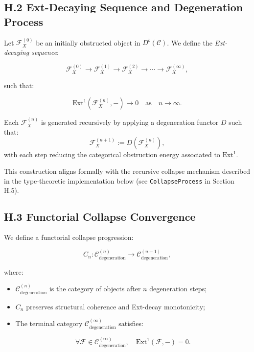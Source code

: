 \documentclass[11pt]{article}
\begin{document}
\subsection*{H.2 Ext-Decaying Sequence and Degeneration Process}

Let \( \mathcal{F}_X^{(0)} \) be an initially obstructed object in \( D^b(\mathcal{C}) \). We define the \emph{Ext-decaying sequence}:

\[
\mathcal{F}_X^{(0)} \longrightarrow \mathcal{F}_X^{(1)} \longrightarrow \mathcal{F}_X^{(2)} \longrightarrow \cdots \longrightarrow \mathcal{F}_X^{(\infty)},
\]

such that:

\[
\mathrm{Ext}^1\left( \mathcal{F}_X^{(n)}, - \right) \to 0 \quad \text{as} \quad n \to \infty.
\]

Each \( \mathcal{F}_X^{(n)} \) is generated recursively by applying a degeneration functor \( D \) such that:
\[
\mathcal{F}_X^{(n+1)} := D(\mathcal{F}_X^{(n)}),
\]
with each step reducing the categorical obstruction energy associated to \( \mathrm{Ext}^1 \).

This construction aligns formally with the recursive collapse mechanism described in the type-theoretic implementation below (see \texttt{CollapseProcess} in Section H.5).


\subsection*{H.3 Functorial Collapse Convergence}

We define a functorial collapse progression:

\[
C_n : \mathcal{C}_{\mathrm{degeneration}}^{(n)} \longrightarrow \mathcal{C}_{\mathrm{degeneration}}^{(n+1)},
\]

where:

\begin{itemize}
    \item \( \mathcal{C}_{\mathrm{degeneration}}^{(n)} \) is the category of objects after \( n \) degeneration steps;
    \item \( C_n \) preserves structural coherence and Ext-decay monotonicity;
    \item The terminal category \( \mathcal{C}_{\mathrm{degeneration}}^{(\infty)} \) satisfies:

\[
\forall \mathcal{F} \in \mathcal{C}_{\mathrm{degeneration}}^{(\infty)}, \quad \mathrm{Ext}^1(\mathcal{F}, -) = 0.
\]
\end{itemize}
\end{document}
